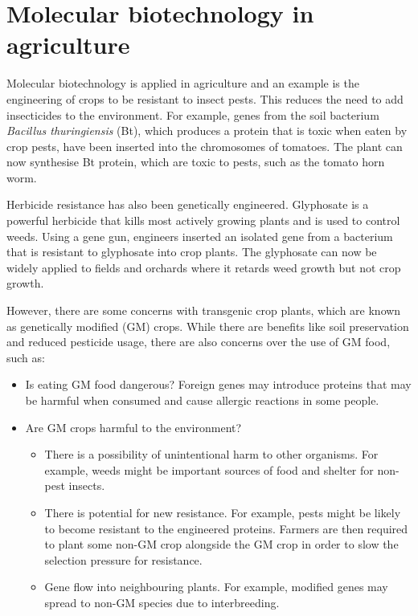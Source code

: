 \documentclass[11pt]{article}
\begin{document}
\newpage
\section{Molecular biotechnology in agriculture}
\label{sec:org71d5816}
Molecular biotechnology is applied in agriculture and an example is the engineering of crops to be resistant to insect pests. This reduces the need to add insecticides to the environment. For example, genes from the soil bacterium \emph{Bacillus thuringiensis} (Bt), which produces a protein that is toxic when eaten by crop pests, have been inserted into the chromosomes of tomatoes. The plant can now synthesise Bt protein, which are toxic to pests, such as the tomato horn worm.


Herbicide resistance has also been genetically engineered. Glyphosate is a powerful herbicide that kills most actively growing plants and is used to control weeds. Using a gene gun, engineers inserted an isolated gene from a bacterium that is resistant to glyphosate into crop plants. The glyphosate can now be widely applied to fields and orchards where it retards weed growth but not crop growth.


However, there are some concerns with transgenic crop plants, which are known as genetically modified (GM) crops. While there are benefits like soil preservation and reduced pesticide usage, there are also concerns over the use of GM food, such as:
\begin{itemize}
\item Is eating GM food dangerous? Foreign genes may introduce proteins that may be harmful when consumed and cause allergic reactions in some people.
\item Are GM crops harmful to the environment?
\begin{itemize}
\item There is a possibility of unintentional harm to other organisms. For example, weeds might be important sources of food and shelter for non-pest insects.
\item There is potential for new resistance. For example, pests might be likely to become resistant to the engineered proteins. Farmers are then required to plant some non-GM crop alongside the GM crop in order to slow the selection pressure for resistance.
\item Gene flow into neighbouring plants. For example, modified genes may spread to non-GM species due to interbreeding.
\end{itemize}
\end{itemize}
\end{document}

